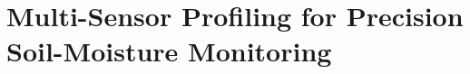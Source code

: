 
\chapter{Multi-Sensor Profiling for Precision Soil-Moisture Monitoring}

\label{physics-aware-chap:pluto}